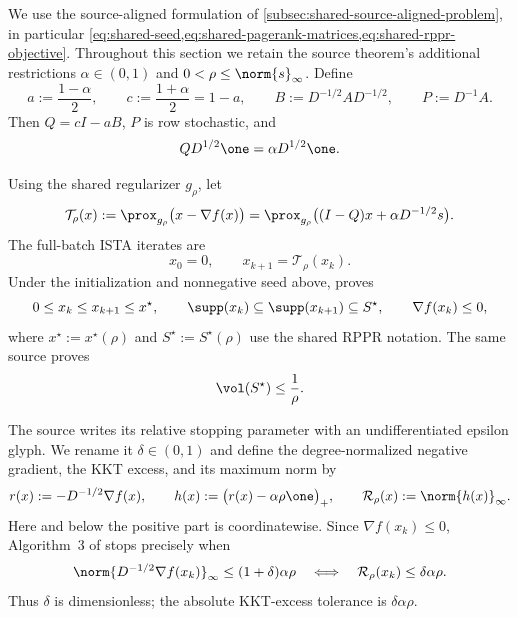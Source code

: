 We use the source-aligned formulation of
\cref{subsec:shared-source-aligned-problem}, in particular
\cref{eq:shared-seed,eq:shared-pagerank-matrices,eq:shared-rppr-objective}.
Throughout this section we retain the source theorem's additional restrictions
\(\alpha\in(0,1)\) and \(0<\rho\leq\norm{s}_\infty\).  Define
\begin{equation}
    a:=\frac{1-\alpha}{2},
    \qquad
    c:=\frac{1+\alpha}{2}=1-a,
    \qquad
    B:=D^{-1/2}AD^{-1/2},
    \qquad
    P:=D^{-1}A.
    \label{eq:rppr-ista-matrices}
\end{equation}
Then \(Q=cI-aB\), \(P\) is row stochastic, and
\begin{equation}
    QD^{1/2}\one=\alpha D^{1/2}\one.
    \label{eq:rppr-degree-eigenvector}
\end{equation}

Using the shared regularizer \(g_\rho\), let
\begin{equation}
    \mathcal{T}_\rho(x)
    :=
    \prox_{g_\rho}\bigl(x-\nabla f(x)\bigr)
    =
    \prox_{g_\rho}\bigl((I-Q)x+\alpha D^{-1/2}s\bigr).
    \label{eq:rppr-ista-map}
\end{equation}
The full-batch ISTA iterates are
\begin{equation}
    x_0=0,
    \qquad
    x_{k+1}=\mathcal{T}_\rho(x_k).
    \label{eq:rppr-batch-ista}
\end{equation}
Under the initialization and nonnegative seed above,
\citet[Theorem~1]{fountoulakis2019variational} proves
\begin{equation}
    0\leq x_k\leq x_{k+1}\leq x^\star,
    \qquad
    \supp(x_k)\subseteq\supp(x_{k+1})\subseteq S^\star,
    \qquad
    \nabla f(x_k)\leq0,
    \label{eq:rppr-monotone-invariants}
\end{equation}
where \(x^\star:=x^\star(\rho)\) and
\(S^\star:=S^\star(\rho)\) use the shared RPPR notation.  The same
source proves
\begin{equation}
    \vol(S^\star)\leq\frac1\rho.
    \label{eq:rppr-support-upper}
\end{equation}

The source writes its relative stopping parameter with an undifferentiated
epsilon glyph. We rename
it \(\delta\in(0,1)\) and define the degree-normalized negative gradient,
the KKT excess, and its maximum norm by
\begin{equation}
    r(x):=-D^{-1/2}\nabla f(x),
    \qquad
    h(x):=\bigl(r(x)-\alpha\rho\one\bigr)_+,
    \qquad
    \mathcal{R}_\rho(x):=\norm{h(x)}_\infty.
    \label{eq:rppr-kkt-excess}
\end{equation}
Here and below the positive part is coordinatewise.  Since
\(\nabla f(x_k)\leq0\), Algorithm~3 of
\citet{fountoulakis2019variational} stops precisely when
\begin{equation}
    \norm{D^{-1/2}\nabla f(x_k)}_\infty
    \leq(1+\delta)\alpha\rho
    \quad\Longleftrightarrow\quad
    \mathcal{R}_\rho(x_k)\leq\delta\alpha\rho.
    \label{eq:rppr-relative-stopping}
\end{equation}
Thus \(\delta\) is dimensionless; the absolute KKT-excess tolerance is
\(\delta\alpha\rho\).

